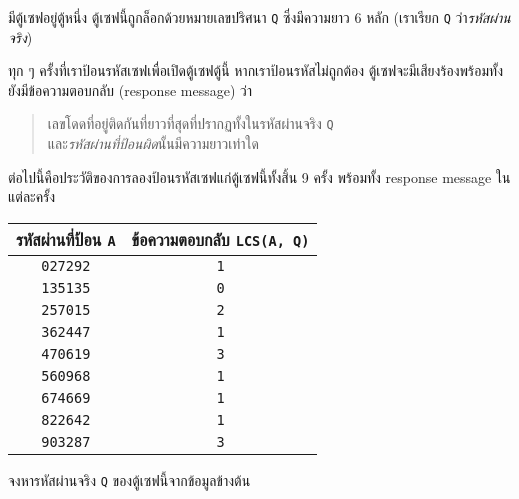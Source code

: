 \question{}

มีตู้เซฟอยู่ตู้หนึ่ง ตู้เซฟนี้ถูกล็อกด้วยหมายเลขปริศนา \lstinline{Q} ซึ่งมีความยาว 6 หลัก 
(เราเรียก \lstinline{Q} ว่า\emph{\hrsp รหัสผ่านจริง\hrsp})

ทุก ๆ ครั้งที่เราป้อนรหัสเซฟเพื่อเปิดตู้เซฟตู้นี้ หากเราป้อนรหัสไม่ถูกต้อง ตู้เซฟจะมีเสียงร้องพร้อมทั้งยังมีข้อความตอบกลับ
(response message) ว่า
\begin{quote}
    \centering
    เลขโดดที่อยู่ติดกันที่ยาวที่สุดที่ปรากฏทั้งในรหัสผ่านจริง \lstinline{Q} \\
    และ\emph{\hrsp รหัสผ่านที่ป้อนผิด\hrsp}นั้นมีความยาวเท่าใด\hrsp%
\end{quote} 

ต่อไปนี้คือประวัติของการลองป้อนรหัสเซฟแก่ตู้เซฟนี้ทั้งสิ้น 9 ครั้ง พร้อมทั้ง response message ในแต่ละครั้ง
\begin{center}
    \smallskip
    \begin{tabular}{@{\quad}c@{\qquad\qquad}c@{\quad}}
        \toprule
        รหัสผ่านที่ป้อน \lstinline|A| & ข้อความตอบกลับ \lstinline|LCS(A, Q)|  \\
        \midrule
        \verb|027292| & \verb|1| \\
        \verb|135135| & \verb|0| \\
        \verb|257015| & \verb|2| \\
        \verb|362447| & \verb|1| \\
        \verb|470619| & \verb|3| \\
        \verb|560968| & \verb|1| \\
        \verb|674669| & \verb|1| \\
        \verb|822642| & \verb|1| \\
        \verb|903287| & \verb|3| \\
        \bottomrule
    \end{tabular}
    \smallskip
\end{center}

จงหารหัสผ่านจริง \lstinline{Q} ของตู้เซฟนี้จากข้อมูลข้างต้น
